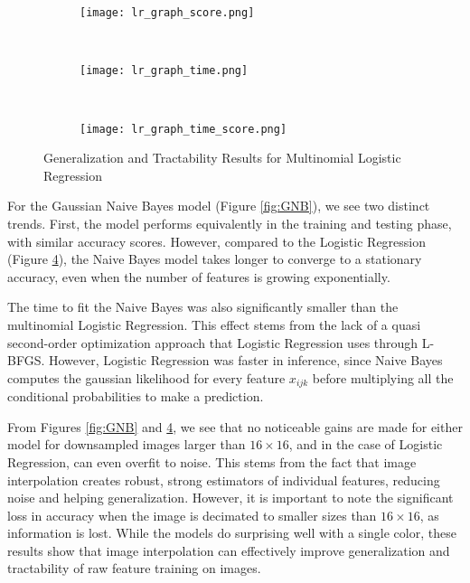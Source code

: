 \documentclass{article}
\begin{document}
\begin{figure}
  \centering
  \begin{subfigure}[b]{0.3\textwidth}
    \centering
    \texttt{[image: lr\_graph\_score.png]}
    \caption*{}
    \label{fig:lr_graph_score}
  \end{subfigure}
  ~
  \begin{subfigure}[b]{0.3\textwidth}
    \centering
    \texttt{[image: lr\_graph\_time.png]}
    \caption*{}
    \label{fig:lr_graph_time}
  \end{subfigure}
  ~
  \begin{subfigure}[b]{0.3\textwidth}
    \centering
    \texttt{[image: lr\_graph\_time\_score.png]}
    \caption*{}
    \label{fig:lr_graph_time_score}
  \end{subfigure}
  \vspace{-10pt}
  \caption{Generalization and Tractability Results for Multinomial Logistic Regression}
  \label{fig:MLR}
\end{figure}

For the Gaussian Naive Bayes model (Figure \ref{fig:GNB}), we see two distinct trends.
First, the model performs equivalently in the training and testing phase, with
similar accuracy scores. However, compared to the Logistic Regression
(Figure \ref{fig:MLR}), the Naive Bayes model takes longer to converge to a
stationary accuracy, even when the number of features is growing exponentially.

The time to fit the Naive Bayes was also significantly smaller than the multinomial
Logistic Regression. This effect stems from the lack of a quasi second-order
optimization approach that Logistic Regression uses through L-BFGS. However,
Logistic Regression was faster in inference, since Naive Bayes computes
the gaussian likelihood for every feature $x_{ijk}$ before multiplying all
the conditional probabilities to make a prediction.

From Figures \ref{fig:GNB} and \ref{fig:MLR}, we see that no noticeable gains
are made for either model for downsampled images larger than $16 \times 16$,
and in the case of Logistic Regression, can even overfit to noise. This stems
from the fact that image interpolation creates robust, strong estimators of
individual features, reducing noise and helping generalization. However,
it is important to note the significant loss in accuracy when the image is
decimated to smaller sizes than $16 \times 16$, as information is lost. While
the models do surprising well with a single color, these results show that
image interpolation can effectively improve generalization and tractability of
raw feature training on images.
\end{document}
